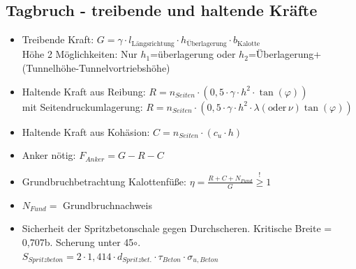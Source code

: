 \documentclass[fleqn,twoside]{article}
\begin{document}
\subsection{Tagbruch - treibende und haltende Kräfte}
\begin{itemize}
    \item Treibende Kraft: $G = \gamma \cdot l_{\text{Längsrichtung}} \cdot h_{\text{Überlagerung}} \cdot b_{\text{Kalotte}}$\\
    Höhe 2 Möglichkeiten: Nur $h_1$=überlagerung oder $h_2$=Überlagerung+(Tunnelhöhe-Tunnelvortriebshöhe)
    \item Haltende Kraft aus Reibung: $R = n_{Seiten} \cdot (0,5 \cdot \gamma \cdot h^2 \cdot \tan(\varphi))$\\
                            mit Seitendruckumlagerung: $R = n_{Seiten} \cdot (0,5 \cdot \gamma \cdot h^2 \cdot \lambda (\text{oder}\, \nu)\tan(\varphi))$
    \item Haltende Kraft aus Kohäsion: $C = n_{Seiten} \cdot (c_u \cdot h)$
    \item Anker nötig: $F_{Anker} = G - R - C$
    \item Grundbruchbetrachtung Kalottenfüße: $\eta = \frac{R+C+N_{Fund}}{G} \overset{!}{\geq} 1$
    \item $N_{Fund} =$ Grundbruchnachweis
    \item Sicherheit der Spritzbetonschale gegen Durchscheren. Kritische Breite = 0,707b. Scherung unter 45$\circ$.\\
            $S_{Spritzbeton}=2 \cdot 1,414 \cdot d_{Spritzbet.} \cdot \tau_{Beton} \cdot \sigma_{u,Beton}$
\end{itemize}

\end{document}
